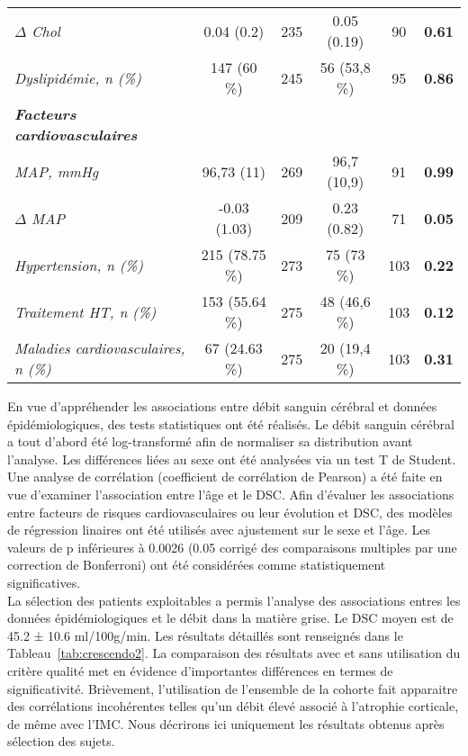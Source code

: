 \begin {table}
\begin{tabularx}{17cm}{X | c c c c c}
	{\em $\Delta$ Chol} & 0.04 (0.2) &235 &0.05 (0.19) &90 &{\bf 0.61}\\
	{\em Dyslipidémie, n (\%)} & 147 (60 \%)& 245 &56 (53,8 \%) &95 &{\bf 0.86}\\
	\hline
	{\em \bf Facteurs cardiovasculaires } &  & & & & \\
	{\em MAP, mmHg} & 96,73 (11) &269 &96,7 (10,9) &91 &{\bf 0.99}\\
	{\em $\Delta$ MAP} & -0.03 (1.03) &209 &0.23 (0.82) &71 &{\bf 0.05}\\
	{\em Hypertension, n (\%)} &215 (78.75 \%) &273 &75 (73 \%) &103 &{\bf 0.22}\\
	{\em Traitement HT, n (\%)} & 153 (55.64 \%) &275 &48 (46,6 \%) &103 &{\bf 0.12}\\
	{\em Maladies cardiovasculaires, n (\%)} & 67 (24.63 \%) &275 &20 (19,4 \%) &103 &{\bf 0.31}\\

\end{tabularx}

\end{table}

En vue d’appréhender les associations entre débit sanguin cérébral et données
épidémiologiques, des tests statistiques ont été réalisés. Le débit sanguin cérébral a tout d’abord été
log-transformé afin de normaliser sa distribution avant l’analyse. Les différences liées au sexe ont été
analysées via un test T de Student. Une analyse de corrélation (coefficient de corrélation de Pearson)
a été faite en vue d’examiner l’association entre l’âge et le DSC. Afin d’évaluer les associations entre
facteurs de risques cardiovasculaires ou leur évolution et DSC, des modèles de régression linaires ont
été utilisés avec ajustement sur le sexe et l’âge. Les valeurs de p inférieures à 0.0026 (0.05 corrigé des
comparaisons multiples par une correction de Bonferroni) ont été considérées comme statistiquement
significatives.\\
La sélection des patients exploitables a permis l’analyse des associations entres les données
épidémiologiques et le débit dans la matière grise. Le DSC moyen est de 45.2 ± 10.6 ml/100g/min. Les
résultats détaillés sont renseignés dans le Tableau~\ref{tab:crescendo2}. La comparaison des résultats avec et sans
utilisation du critère qualité met en évidence d’importantes différences en termes de significativité.
Brièvement, l’utilisation de l’ensemble de la cohorte fait apparaitre des corrélations incohérentes
telles qu’un débit élevé associé à l’atrophie corticale, de même avec l’IMC. Nous décrirons ici
uniquement les résultats obtenus après sélection des sujets.\\

